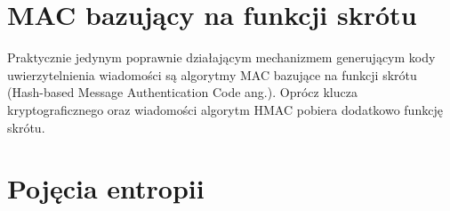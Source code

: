 \section{MAC bazujący na funkcji skrótu}
Praktycznie jedynym poprawnie działającym mechanizmem generującym kody uwierzytelnienia wiadomości są algorytmy
MAC bazujące na funkcji skrótu (Hash-based Message Authentication Code ang.). 
Oprócz klucza kryptograficznego oraz wiadomości algorytm HMAC pobiera dodatkowo funkcję skrótu. 



\section{Pojęcia entropii}
